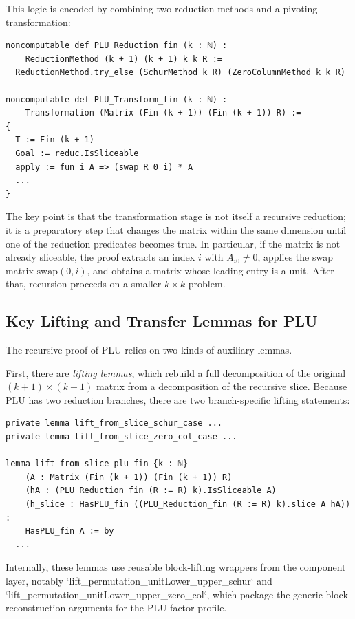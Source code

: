 \documentclass[pdflatex,sn-mathphys-num]{sn-jnl}%
\theoremstyle{thmstyleone}%
\theoremstyle{thmstyletwo}%
\theoremstyle{thmstylethree}%
\begin{document}
This logic is encoded by combining two reduction methods and a pivoting transformation:

\begin{lstlisting}
noncomputable def PLU_Reduction_fin (k : ℕ) :
    ReductionMethod (k + 1) (k + 1) k k R :=
  ReductionMethod.try_else (SchurMethod k R) (ZeroColumnMethod k k R)

noncomputable def PLU_Transform_fin (k : ℕ) :
    Transformation (Matrix (Fin (k + 1)) (Fin (k + 1)) R) :=
{
  T := Fin (k + 1)
  Goal := reduc.IsSliceable
  apply := fun i A => (swap R 0 i) * A
  ...
}
\end{lstlisting}

The key point is that the transformation stage is not itself a recursive reduction; it is a preparatory step that changes the matrix within the same dimension until one of the reduction predicates becomes true.  In particular, if the matrix is not already sliceable, the proof extracts an index \(i\) with \(A_{i0}\neq 0\), applies the swap matrix \(\mathrm{swap}(0,i)\), and obtains a matrix whose leading entry is a unit.  After that, recursion proceeds on a smaller \(k\times k\) problem.

\subsection{Key Lifting and Transfer Lemmas for PLU}
The recursive proof of PLU relies on two kinds of auxiliary lemmas.

First, there are \emph{lifting lemmas}, which rebuild a full decomposition of the original \((k+1)\times(k+1)\) matrix from a decomposition of the recursive slice.  Because PLU has two reduction branches, there are two branch-specific lifting statements:
\begin{lstlisting}
private lemma lift_from_slice_schur_case ...
private lemma lift_from_slice_zero_col_case ...

lemma lift_from_slice_plu_fin {k : ℕ}
    (A : Matrix (Fin (k + 1)) (Fin (k + 1)) R)
    (hA : (PLU_Reduction_fin (R := R) k).IsSliceable A)
    (h_slice : HasPLU_fin ((PLU_Reduction_fin (R := R) k).slice A hA)) :
    HasPLU_fin A := by
  ...
\end{lstlisting}
Internally, these lemmas use reusable block-lifting wrappers from the component layer, notably `lift_permutation_unitLower_upper_schur` and `lift_permutation_unitLower_upper_zero_col`, which package the generic block reconstruction arguments for the PLU factor profile.
\end{document}
